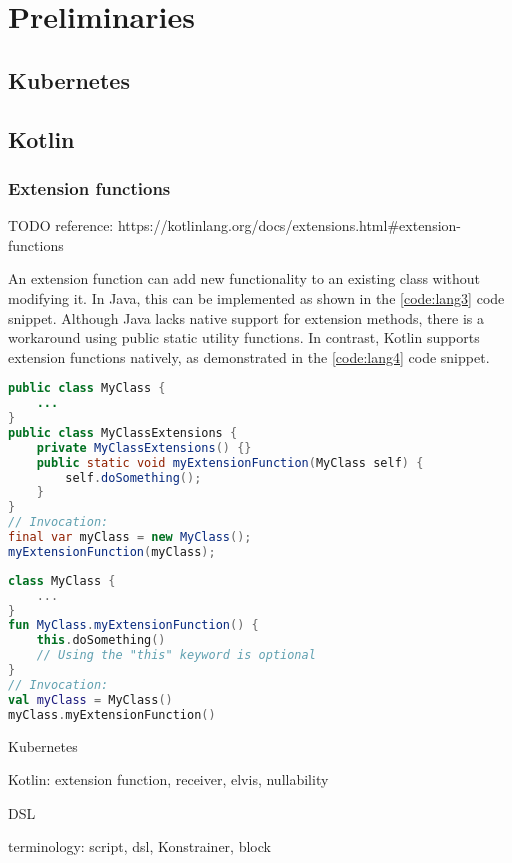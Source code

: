 \setlength{\parindent}{0pt}
\setlength{\parskip}{0.6em}

\chapter{Preliminaries}
\label{chap:prerequisites}

\section{Kubernetes}

\section{Kotlin}

\subsection{Extension functions}
\label{sec:extension}

TODO reference: https://kotlinlang.org/docs/extensions.html\#extension-functions

An extension function can add new functionality to an existing class without modifying it. In Java, this can be implemented as shown in the \ref{code:lang3} code snippet. Although Java lacks native support for extension methods, there is a workaround using public static utility functions. In contrast, Kotlin supports extension functions natively, as demonstrated in the \ref{code:lang4} code snippet.

\begin{lstlisting}[caption={Extension functions in Java},language=Java,label=code:lang3]
public class MyClass {
    ...
}
public class MyClassExtensions {
    private MyClassExtensions() {}
    public static void myExtensionFunction(MyClass self) {
        self.doSomething();
    }
}
// Invocation:
final var myClass = new MyClass();
myExtensionFunction(myClass);
\end{lstlisting}

\begin{lstlisting}[caption={Extension functions in Kotlin},language=Kotlin,label=code:lang4]
class MyClass {
    ...
}
fun MyClass.myExtensionFunction() {
    this.doSomething()
    // Using the "this" keyword is optional
}
// Invocation:
val myClass = MyClass()
myClass.myExtensionFunction()
\end{lstlisting}

Kubernetes

Kotlin: extension function, receiver, elvis, nullability

DSL

terminology: script, dsl, Konstrainer, block
